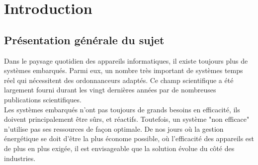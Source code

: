 \documentclass[11pt,a4paper,oneside]{report}
\begin{document}
%


\thispagestyle{empty} 
\setcounter{page}{0}
\tableofcontents




\chapter{Introduction}{}
\setcounter{page}{1}


\section{Présentation générale du sujet}

Dans le paysage quotidien des appareils informatiques, il existe toujours plus de systèmes embarqués. 
Parmi eux, un nombre très important de systèmes temps réel qui nécessitent des 
ordonnanceurs adaptés. Ce champ scientifique a été largement fourni durant les 
vingt dernières années par de nombreuses publications scientifiques. \\

Les systèmes embarqués n'ont pas toujours de grands besoins en efficacité, 
ils doivent principalement être sûrs, et réactifs. 
Toutefois, un système "non efficace" n'utilise pas ses ressources de façon optimale. 
De nos jours où la gestion énergétique se doit d'être la plus économe possible, 
où l'efficacité des appareils est de plus en plus exigée, il est envisageable que 
la solution évolue du côté des industries.\\
\end{document}
